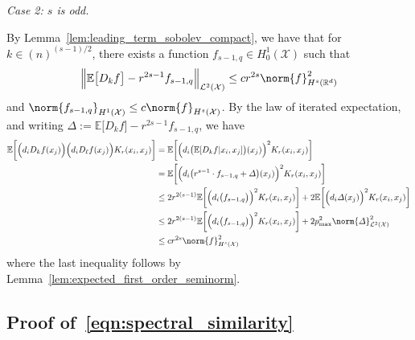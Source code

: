\documentclass{article}
\newcommand{\Reals}{\mathbb{R}}
\newcommand{\1}{\mathbf{1}}
\newcommand{\Rd}{\Reals^d}
\newcommand{\Xset}{\mathcal{X}}
\newcommand{\Leb}{\mathcal{L}}
\newcommand{\Ebb}{\mathbb{E}}
\theoremstyle{alden}
\theoremstyle{aldenthm}
\theoremstyle{definition}
\theoremstyle{remark}
\begin{document}
\textit{Case 2: $s$ is odd.}

By Lemma~\ref{lem:leading_term_sobolev_compact}, we have that for $k \in (n)^{(s - 1)/2}$, there exists a function $f_{s - 1,q} \in H_0^1(\Xset)$ such that
\begin{equation*}
\Bigl\|\Ebb\bigl[D_kf\bigr] - r^{2{s - 1}}f_{s - 1,q}\Bigr\|_{\Leb^2(\Xset)} \leq c r^{2s} \norm{f}_{H^s(\Rd)}^2
\end{equation*}
and $\norm{f_{s - 1,q}}_{H^1(\Xset)} \leq c \norm{f}_{H^s(\Xset)}$. By the law of iterated expectation, and writing $\varDelta := \Ebb\bigl[D_kf\bigr] - r^{2{s - 1}}f_{s - 1,q}$, we have
\begin{align*}
\Ebb\biggl[\Bigl(d_iD_kf(x_j)\Bigr) \Bigl(d_iD_{\ell}f(x_j)\Bigr) K_r(x_i,x_j)\biggr] & =  \Ebb\biggl[\Bigl(d_i\bigl(\Ebb[D_kf|x_i,x_j]\bigr)(x_j)\Bigr)^2K_r(x_i,x_j)\biggr] \nonumber \\
& = \Ebb\biggl[\Bigl(d_i\bigl(r^{s - 1}\cdot f_{s - 1,q} + \varDelta \bigr)(x_j)\Bigr)^2K_r(x_i,x_j)\biggr] \\
& \leq 2r^{2(s - 1)}\Ebb\biggl[\Bigl(d_i\bigl(f_{s - 1,q}\bigr)\Bigr)^2K_r(x_i,x_j)\biggr]  + 2 \Ebb \biggl[\Bigl(d_i\varDelta(x_j)\Bigr)^2K_r(x_i,x_j)\biggr] \\
& \leq 2r^{2(s - 1)}\Ebb\biggl[\Bigl(d_i\bigl(f_{s - 1,q}\bigr)\Bigr)^2K_r(x_i,x_j)\biggr] + 2p_{\max}^2\norm{\varDelta}_{\Leb^2(\Xset)}^2 \\
& \leq c r^{2s} \norm{f}_{H^s(\Xset)}^2
\label{eqn:expected_difference_operators_sobolev_pf1}
\end{align*}
where the last inequality follows by Lemma~\ref{lem:expected_first_order_seminorm}.

\subsection{Proof of~\eqref{eqn:spectral_similarity}}
\end{document}
